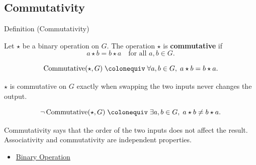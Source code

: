 \subsection*{Commutativity}
\label{subsec:commutativity}

\begin{definitionbox}{Definition (Commutativity)}
\begin{definition}[Commutativity]
\label{def:algebraic-commutativity}
Let $\star$ be a binary operation on $G$.
The operation $\star$ is \textbf{commutative} if
\[
a \star b = b \star a
\quad \text{for all } a,b \in G.
\]
\end{definition}
\end{definitionbox}

\begin{remark*}
\[
\operatorname{Commutative}(\star,G)
\;\colonequiv\;
\forall a,b \in G,\; a \star b = b \star a.
\]
\end{remark*}

\begin{remark*}
$\star$ is commutative on $G$ exactly when swapping the two inputs never changes
the output.
\end{remark*}

\begin{remark*}
\[
\neg\operatorname{Commutative}(\star,G)
\;\colonequiv\;
\exists a,b\in G,\; a\star b\neq b\star a.
\]
\end{remark*}

\begin{remark*}[Interpretation]
Commutativity says that the order of the two inputs does not affect the
result.  Associativity and commutativity are independent properties.
\end{remark*}

\begin{dependencies}
\begin{itemize}
  \item \hyperref[def:binary-operation]{Binary Operation}
\end{itemize}
\end{dependencies}

